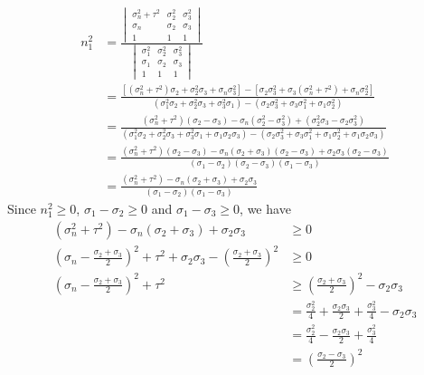 \begin{align}
n_1^2 &= \frac{\begin{vmatrix}
\sigma_n^2 + \tau^2 & \sigma_2^2 & \sigma_3^2 \\
\sigma_n & \sigma_2 & \sigma_3 \\
1 & 1 & 1
\end{vmatrix}}
{\begin{vmatrix}
\sigma_1^2 & \sigma_2^2 & \sigma_3^2 \\
\sigma_1 & \sigma_2 & \sigma_3 \\
1 & 1 & 1    
\end{vmatrix}} \nonumber \\
&= \frac{[(\sigma_n^2 + \tau^2)\sigma_2 + \sigma_2^2 \sigma_3 + \sigma_n\sigma_3^2] - [\sigma_2\sigma_3^2 + \sigma_3(\sigma_n^2 + \tau^2) + \sigma_n\sigma_2^2]}{(\sigma_1^2\sigma_2 + \sigma_2^2\sigma_3 + \sigma_3^2\sigma_1) - (\sigma_2\sigma_3^2 + \sigma_3\sigma_1^2 + \sigma_1\sigma_2^2)} \nonumber \\
&= \frac{(\sigma_n^2 + \tau^2)(\sigma_2 - \sigma_3) - \sigma_n(\sigma_2^2 - \sigma_3^2)+(\sigma_2^2\sigma_3 - \sigma_2\sigma_3^2)}{(\sigma_1^2\sigma_2 + \sigma_2^2\sigma_3 + \sigma_3^2\sigma_1 + \sigma_1\sigma_2\sigma_3) - (\sigma_2\sigma_3^2 + \sigma_3\sigma_1^2 + \sigma_1\sigma_2^2 + \sigma_1\sigma_2\sigma_3)} \nonumber \\
&= \frac{(\sigma_n^2 + \tau^2)(\sigma_2 - \sigma_3) - \sigma_n(\sigma_2 + \sigma_3)(\sigma_2 - \sigma_3) + \sigma_2\sigma_3(\sigma_2 - \sigma_3)}{(\sigma_1 - \sigma_2)(\sigma_2 - \sigma_3)(\sigma_1-\sigma_3)} \nonumber \\
&= \frac{(\sigma_n^2 + \tau^2) - \sigma_n(\sigma_2 + \sigma_3) + \sigma_2\sigma_3}{(\sigma_1 - \sigma_2)(\sigma_1-\sigma_3)}
\end{align}
Since $n_1^2 \geq 0$, $\sigma_1 - \sigma_2 \geq 0$ and $\sigma_1 - \sigma_3 \geq 0$, we have
\begin{align}
(\sigma_n^2 + \tau^2) - \sigma_n(\sigma_2 + \sigma_3) + \sigma_2\sigma_3 &\geq 0 \nonumber \\
\left(\sigma_n-\frac{\sigma_2 + \sigma_3}{2}\right)^2 + \tau^2 + \sigma_2\sigma_3 - \left(\frac{\sigma_2 + \sigma_3}{2}\right)^2 &\geq 0 \nonumber \\
\left(\sigma_n-\frac{\sigma_2 + \sigma_3}{2}\right)^2 + \tau^2 &\geq \left(\frac{\sigma_2 + \sigma_3}{2}\right)^2 - \sigma_2\sigma_3 \nonumber \\
&= \frac{\sigma_2^2}{4} + \frac{\sigma_2\sigma_3}{2} +\frac{\sigma_3^2}{4} - \sigma_2\sigma_3 \nonumber \\
&= \frac{\sigma_2^2}{4} - \frac{\sigma_2\sigma_3}{2} +\frac{\sigma_3^2}{4} \nonumber \\
&= \left(\frac{\sigma_2 - \sigma_3}{2}\right)^2
\end{align}

